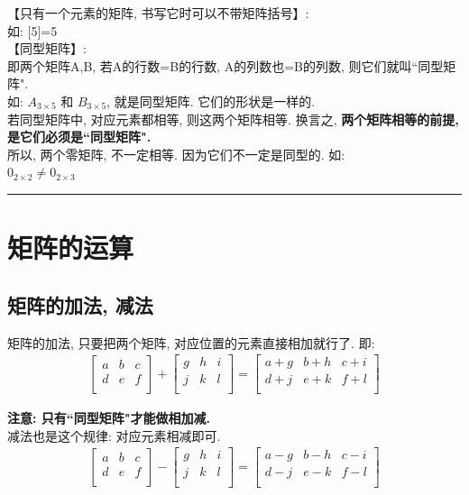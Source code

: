 \documentclass[UTF8]{ctexart}
\begin{document}
	【只有一个元素的矩阵, 书写它时可以不带矩阵括号】:\\
	如: [5]=5 \\
	
	【同型矩阵】: \\
	即两个矩阵A,B, 若A的行数=B的行数,  A的列数也=B的列数, 则它们就叫``同型矩阵". \\
	如: $A_{3×5}$ 和  $B_{3×5}$, 就是同型矩阵. 它们的形状是一样的. \\
	
	若同型矩阵中, 对应元素都相等, 则这两个矩阵相等. 换言之, \textbf{两个矩阵相等的前提, 是它们必须是``同型矩阵".} \\
	
	所以, 两个零矩阵, 不一定相等. 因为它们不一定是同型的. 如:\\
	$	0_{2×2}\ne 0_{2×3}	$\\
	

	\hrule


\section{矩阵的运算}
	
	\subsection{矩阵的加法, 减法}
	
	矩阵的加法, 只要把两个矩阵, 对应位置的元素直接相加就行了. 即: 	
	\begin{align*}
		\left[ \begin{matrix}
			a&		b&		c\\
			d&		e&		f\\
		\end{matrix} \right] +\left[ \begin{matrix}
			g&		h&		i\\
			j&		k&		l\\
		\end{matrix} \right] =\left[ \begin{matrix}
			a+g&		b+h&		c+i\\
			d+j&		e+k&		f+l\\
		\end{matrix} \right]
	\end{align*}
	
	\textbf{注意: 只有``同型矩阵"才能做相加减.} \\
	
	减法也是这个规律: 对应元素相减即可. 	
	\begin{align*}
	\left[ \begin{matrix}
		a&		b&		c\\
		d&		e&		f\\
	\end{matrix} \right] -\left[ \begin{matrix}
		g&		h&		i\\
		j&		k&		l\\
	\end{matrix} \right] =\left[ \begin{matrix}
		a-g&		b-h&		c-i\\
		d-j&		e-k&		f-l\\
	\end{matrix} \right]
\end{align*}	
	
\end{document}
